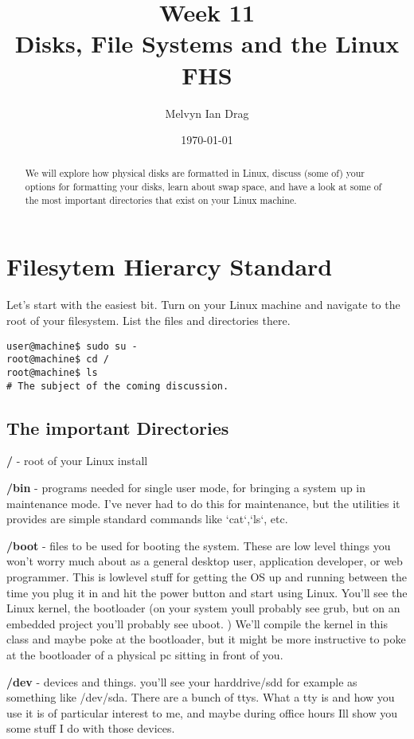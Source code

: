 \documentclass[10pt]{article}
\title{\textbf{Week 11} \\
\Large Disks, File Systems and the Linux FHS}
\author{
	Melvyn Ian Drag
}
\date{\today}
\begin{document}
\maketitle

\begin{abstract}
We will explore how physical disks are formatted in Linux, discuss (some of) your options for formatting your disks, learn about swap space, and have a look at some of the most important directories that exist on your Linux machine.
\end{abstract}


\section{Filesytem Hierarcy Standard}
Let's start with the easiest bit. Turn on your Linux machine and navigate to the root of your filesystem. List the files and directories there.

\begin{lstlisting}
user@machine$ sudo su -
root@machine$ cd /
root@machine$ ls
# The subject of the coming discussion.
\end{lstlisting}

\subsection{The important Directories}

{\color{red} \textbf{/}} - root of your Linux install

{\color{red} \textbf{/bin}} - programs needed for single user mode, for bringing a system up in maintenance mode. I've never had to do this for maintenance, but the utilities it provides are simple standard commands like `cat`,`ls`, etc.

{\color{red} \textbf{/boot}} - files to be used for booting the system. These are low level things you won't worry much about as a general desktop user, application developer, or web programmer. This is lowlevel stuff for getting the OS up and running between the time you plug it in and hit the power button and start using Linux. You'll see the Linux kernel, the bootloader (on your system youll probably see grub, but on an embedded project you'll probably see uboot. ) We'll compile the kernel in this class and maybe poke at the bootloader, but it might be more instructive to poke at the bootloader of a physical pc sitting in front of you.

{\color{red} \textbf{/dev}} - devices and things. you'll see your harddrive/sdd for example as something like /dev/sda. There are a bunch of ttys. What a tty is and how you use it is of particular interest to me, and maybe during office hours Ill show you some stuff I do with those devices.
\end{document}
